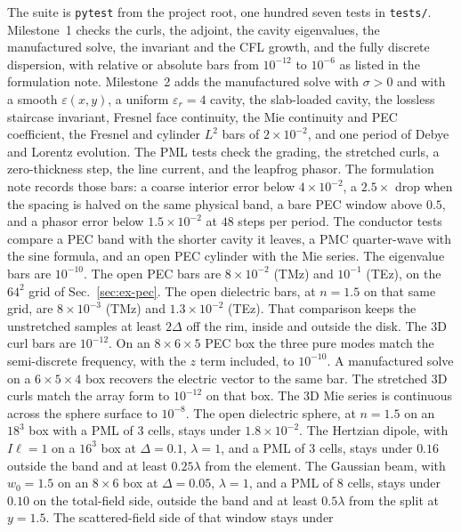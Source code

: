 \documentclass[11pt,a4paper]{article}
\begin{document}
The suite is \texttt{pytest} from the project root, one hundred seven tests in
\texttt{tests/}. Milestone~1 checks the curls, the adjoint, the cavity
eigenvalues, the manufactured solve, the invariant and the CFL growth, and
the fully discrete dispersion, with relative or absolute bars from
$10^{-12}$ to $10^{-6}$ as listed in the formulation note. Milestone~2 adds
the manufactured solve with $\sigma>0$ and with a smooth
$\varepsilon(x,y)$, a uniform $\varepsilon_r=4$ cavity, the slab-loaded
cavity, the lossless staircase invariant, Fresnel face continuity, the Mie
continuity and PEC coefficient, the Fresnel and cylinder $L^2$ bars of
$2\times 10^{-2}$, and one period of Debye and Lorentz evolution. The PML
tests check the grading, the stretched curls, a zero-thickness step, the
line current, and the leapfrog phasor. The formulation note records those
bars: a coarse interior error below $4\times 10^{-2}$, a $2.5\times$ drop
when the spacing is halved on the same physical band, a bare PEC window
above $0.5$, and a phasor error below $1.5\times 10^{-2}$ at $48$ steps
per period. The conductor tests compare a PEC band with the shorter cavity
it leaves, a PMC quarter-wave with the sine formula, and an open PEC
cylinder with the Mie series. The eigenvalue bars are $10^{-10}$. The
open PEC bars are $8\times 10^{-2}$ (TMz) and $10^{-1}$ (TEz), on the
$64^2$ grid of Sec.~\ref{sec:ex-pec}. The open dielectric bars, at
$n=1.5$ on that same grid, are $8\times 10^{-3}$ (TMz) and
$1.3\times 10^{-2}$ (TEz). That comparison keeps the unstretched samples
at least $2\Delta$ off the rim, inside and outside the disk. The 3D
curl bars are $10^{-12}$. On an $8\times 6\times 5$ PEC box the three
pure modes match the semi-discrete frequency, with the $z$ term included,
to $10^{-10}$. A manufactured solve on a $6\times 5\times 4$ box recovers
the electric vector to the same bar. The stretched 3D curls match the
array form to $10^{-12}$ on that box. The 3D Mie series is continuous
across the sphere surface to $10^{-8}$. The open dielectric sphere, at
$n=1.5$ on an $18^3$ box with a PML of $3$ cells, stays under
$1.8\times 10^{-2}$. The Hertzian dipole, with $I\ell=1$ on a $16^3$
box at $\Delta=0.1$, $\lambda=1$, and a PML of $3$ cells, stays under
$0.16$ outside the band and at least $0.25\lambda$ from the element.
The Gaussian beam, with $w_0=1.5$ on an $8\times 6$ box at $\Delta=0.05$,
$\lambda=1$, and a PML of $8$ cells, stays under $0.10$ on the total-field
side, outside the band and at least $0.5\lambda$ from the split at
$y=1.5$. The scattered-field side of that window stays under
\end{document}
